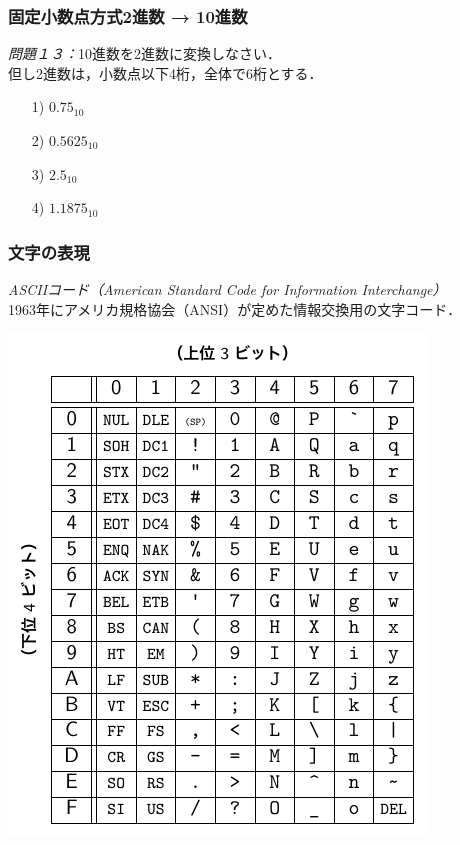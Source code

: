 \documentclass{beamer}                 %
\begin{document}
\begin{frame}
  \frametitle{固定小数点方式2進数 →  10進数}
  \emph{問題１３：}10進数を2進数に変換しなさい．\\
       但し2進数は，小数点以下4桁，全体で6桁とする．
       \vfill
  \begin{enumerate}
  \item[1)] $0.75_{10}$
  \vfill
  \item[2)] $0.5625_{10}$
  \vfill
  \item[3)] $2.5_{10}$
  \vfill
  \item[4)] $1.1875_{10}$
  \end{enumerate}
\end{frame}

\begin{frame}
  \frametitle{文字の表現}
  \emph{ASCIIコード（American Standard Code for Information Interchange）}\\
  1963年にアメリカ規格協会（ANSI）が定めた情報交換用の文字コード．
  
  \centerline{\includegraphics[scale=0.80]{../Tikz/ascii.pdf}}

\end{frame}
\end{document}
